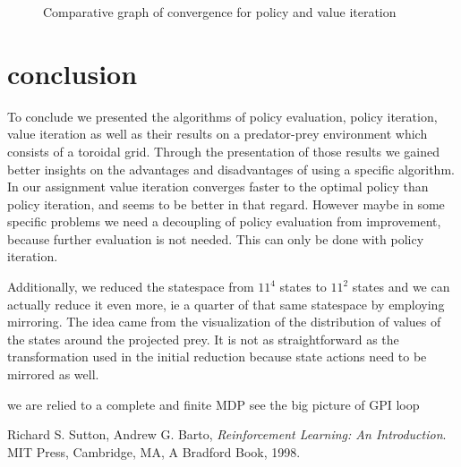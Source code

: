 \documentclass[paper=a4, fontsize=11pt]{scrartcl}
\numberwithin{equation}{section}		%
\numberwithin{figure}{section}			%
\numberwithin{table}{section}				%
\begin{document}
\begin{figure}[H] \centering
{}
\caption{Comparative graph of convergence for policy and value iteration} \label{converge}
\end{figure}

\section{conclusion}
\label{discussion}
To conclude we presented the algorithms of policy evaluation, policy iteration, value iteration as well as their results on a predator-prey environment which consists of a toroidal grid. Through the presentation of those results we gained better insights on the advantages and disadvantages of using a specific algorithm. In our assignment value iteration converges faster to the optimal policy than policy iteration, and seems to be better in that regard. However maybe in some specific problems we need a decoupling of policy evaluation from improvement, because further evaluation is not needed. This can only be done with policy iteration.

Additionally, we reduced the statespace from $11^4$ states to $11^2$ states and we can actually reduce it even more, ie a quarter of that same statespace by employing mirroring. The idea came from the visualization of the distribution of values of the states around the projected prey. It is not as straightforward as the transformation used in the initial reduction because state actions need to be mirrored as well.

we are relied to a complete and finite MDP
see the big picture of GPI loop 



\begin{thebibliography}{9}

  Richard S. Sutton, Andrew G. Barto,
  \emph{Reinforcement Learning: An Introduction}.
  MIT Press, Cambridge, MA, 
  A Bradford Book,
  1998.

\end{thebibliography}

\end{document}
